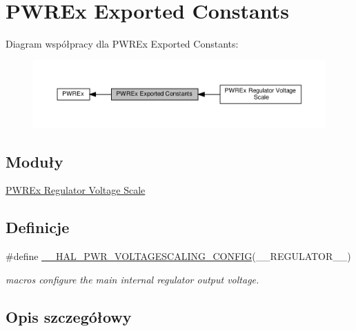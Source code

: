 \hypertarget{group___p_w_r_ex___exported___constants}{}\section{P\+W\+R\+Ex Exported Constants}
\label{group___p_w_r_ex___exported___constants}
Diagram współpracy dla P\+W\+R\+Ex Exported Constants\+:\nopagebreak
\begin{figure}[H]
\begin{center}
\leavevmode
\includegraphics[width=350pt]{group___p_w_r_ex___exported___constants}
\end{center}
\end{figure}
\subsection*{Moduły}
\begin{DoxyCompactItemize}
\item 
\hyperlink{group___p_w_r_ex___regulator___voltage___scale}{P\+W\+R\+Ex Regulator Voltage Scale}
\end{DoxyCompactItemize}
\subsection*{Definicje}
\begin{DoxyCompactItemize}
\item 
\#define \hyperlink{group___p_w_r_ex___exported___constants_ga1ee778f7ff494723bd0ef04ec44b0f77}{\+\_\+\+\_\+\+H\+A\+L\+\_\+\+P\+W\+R\+\_\+\+V\+O\+L\+T\+A\+G\+E\+S\+C\+A\+L\+I\+N\+G\+\_\+\+C\+O\+N\+F\+IG}(\+\_\+\+\_\+\+R\+E\+G\+U\+L\+A\+T\+O\+R\+\_\+\+\_\+)
\begin{DoxyCompactList}\small\item\em macros configure the main internal regulator output voltage. \end{DoxyCompactList}\end{DoxyCompactItemize}


\subsection{Opis szczegółowy}


